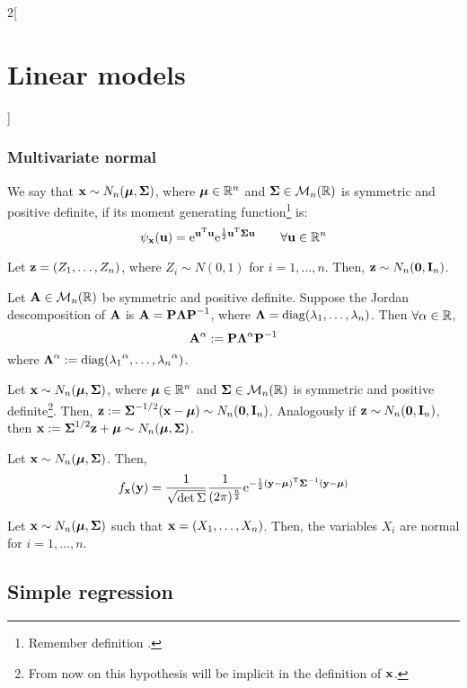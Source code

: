 \documentclass[../../../main_math.tex]{subfiles}
\begin{document}
\begin{multicols}{2}[\section{Linear models}]
  \subsubsection{Multivariate normal}
  \begin{definition}
    We say that $\vf{x}\sim N_n(\vf\mu,\vf\Sigma)$, where $\vf\mu\in\RR^n$ and $\vf\Sigma\in\mathcal{M}_n(\RR)$ is symmetric and positive definite, if its moment generating function\footnote{Remember definition .} is: $$\psi_{\vf{x}}(\vf{u})=\exp{\transpose{\vf{u}}\vf{u}}\exp{\frac{1}{2}\transpose{\vf{u}}\vf\Sigma\vf{u}}\qquad\forall\vf{u}\in\RR^n$$
  \end{definition}
  \begin{proposition}
    Let $\vf{z}=(Z_1,\ldots,Z_n)$, where $Z_i\sim N(0,1)$ for $i=1,\ldots,n$. Then, $\vf{z}\sim N_n(\vf{0},\vf{I}_n)$.
  \end{proposition}
  \begin{definition}
    Let $\vf{A}\in\mathcal{M}_n(\RR)$ be symmetric and positive definite. Suppose the Jordan descomposition of $\vf{A}$ is $\vf{A}=\vf{P}\vf{\Lambda}\vf{P}^{-1}$, where $\vf{\Lambda}=\diag(\lambda_1,\ldots,\lambda_n)$. Then $\forall \alpha\in\RR$, $$\vf{A}^\alpha:=\vf{P}\vf{\Lambda}^\alpha\vf{P}^{-1}$$ where $\vf{\Lambda}^\alpha:=\diag({\lambda_1}^\alpha,\ldots,{\lambda_n}^\alpha)$.
  \end{definition}
  \begin{proposition}
    Let $\vf{x}\sim N_n(\vf\mu,\vf\Sigma)$, where $\vf\mu\in\RR^n$ and $\vf\Sigma\in\mathcal{M}_n(\RR)$ is symmetric and positive definite\footnote{From now on this hypothesis will be implicit in the definition of $\vf{x}$.}. Then, $\vf{z}:={\vf\Sigma}^{-1/2}(\vf{x}-\vf{\mu})\sim N_n(\vf{0},\vf{I}_n)$.
    Analogously if $\vf{z}\sim N_n(\vf{0},\vf{I}_n)$, then $\vf{x}:={\vf\Sigma}^{1/2}\vf{z}+\vf\mu\sim N_n(\vf\mu,\vf\Sigma)$.
  \end{proposition}
  \begin{proposition}
    Let $\vf{x}\sim N_n(\vf\mu,\vf\Sigma)$. Then, $$f_{\vf{x}}(\vf{y})=\frac{1}{\sqrt{\det\Sigma}}\frac{1}{(2\pi)^{\frac{n}{2}}}\exp{-\frac{1}{2}\transpose{(\vf{y}-\vf\mu)}{\vf\Sigma}^{-1}(\vf{y}-\vf\mu)}$$
  \end{proposition}
  \begin{proposition}
    Let $\vf{x}\sim N_n(\vf\mu,\vf\Sigma)$ such that $\vf{x}=(X_1,\ldots,X_n)$. Then, the variables $X_i$ are normal for $i=1,\ldots,n$.
  \end{proposition}
  \subsection{Simple regression}

\end{multicols}
\end{document}
